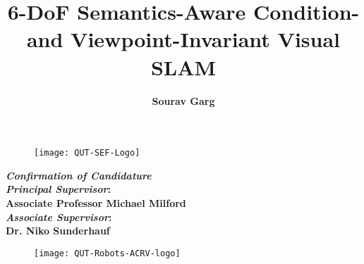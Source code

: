 \documentclass{article}
\title{\textbf{\huge 6-DoF Semantics-Aware Condition- and Viewpoint-Invariant Visual SLAM}}
\author{\textbf{\Large Sourav Garg}}
\date{}
\begin{document}
\begin{figure}
\centering
\texttt{[image: QUT-SEF-Logo]}
\end{figure}

\vspace{5cm}

\maketitle

\vspace{1cm}
\begin{center}
\textbf{
\emph{\LARGE Confirmation of Candidature\\}
}
\vspace{2cm}
\textbf{
\Large \emph{Principal Supervisor}: \\ Associate Professor Michael Milford \\
}
\vspace{1cm}
\textbf
{
\Large \emph{Associate Supervisor}: \\ Dr. Niko Sunderhauf \\
} 
\end{center}

\vspace{2cm}

\begin{figure}
\centering
\texttt{[image: QUT-Robots-ACRV-logo]}
\end{figure}

\pagebreak
\end{document}
